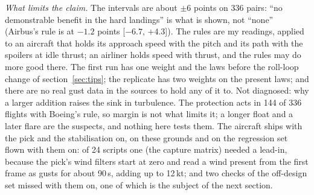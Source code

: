 \documentclass[10pt,a4paper,twocolumn]{article}
\begin{document}
\begin{table}[t]\centering\footnotesize
\resizebox{\textwidth}{!}{}
\caption{The replicate: the arms flown again on the present laws at two weights (seven turbulence weathers, seeds 801 to 824). Hard (flagged): flights that landed hard, of which flights that crossed the assumed structural limits (2.5\,$g$ or $-1\,g$, 200\,KEAS, Mach 0.7); room: the median distance under the angle-of-attack limit below 500\,ft,
negative over it; other columns as table~\ref{tab:rules}.}\label{tab:rulesv3}
\end{table}
\begin{table}[t]\centering\footnotesize
\resizebox{\textwidth}{!}{}
\caption{The replicate's contrasts, paired by case; rows four to seven, the aircraft's own system against each rule, are the prediction written before the flights were looked at. Columns as table~\ref{tab:rulesc}.}\label{tab:rulesv3c}
\end{table}

\emph{What limits the claim.} The intervals are about $\pm6$ points on 336 pairs: ``no demonstrable benefit in the hard landings'' is what is shown, not ``none'' (Airbus's rule is at $-1.2$ points [$-6.7$, $+4.3$]). The rules are my readings, applied to an aircraft that holds its
approach speed with the pitch and its path with the spoilers at idle thrust; an airliner holds speed with thrust, and the rules may do more good there. The first run has one weight and the laws before the roll-loop change of section~\ref{sec:tips}; the replicate has two weights on the present laws; and there are no real gust data in the sources to hold any of it to. Not diagnosed: why a larger addition raises the sink in turbulence. The protection acts in 144 of 336 flights with Boeing's rule, so margin is not what limits it;
a longer float and a later flare are the suspects, and nothing here tests them. The aircraft ships with the pick and the stabilisation on, on these grounds and on the regression set flown with them on: of 24 scripts one (the capture matrix) needed a lead-in, because the pick's wind filters start at zero and read a wind
present from the first frame as gusts for about 90\,s, adding up to 12\,kt; and two checks of the off-design set missed with them on, one of which is the subject of the next section.
\end{document}
